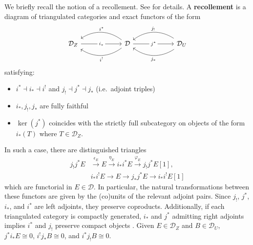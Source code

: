 \documentclass[11pt]{amsart}
\theoremstyle{plain}
\theoremstyle{definition}
\numberwithin{equation}{section}
\numberwithin{theorem}{section}
\begin{document}
We briefly recall the notion of a recollement. 
See \cite[\S 1.4]{Beilinson/Berstein/Deligne/Gabber:2018} for details. 
A \textbf{recollement} is a diagram of triangulated categories and exact functors of the form 
\begin{displaymath}
        \begin{tikzcd}[column sep=6em]
            {\mathcal{D}_Z} & {\mathcal{D}} & {\mathcal{D}_U}
            \arrow["{i_\ast}" description, from=1-1, to=1-2]
            \arrow["{i^\ast}"', bend right=35, from=1-2, to=1-1]
            \arrow["{i^!}", bend left=35, from=1-2, to=1-1]
            \arrow["{j^\ast}" description, from=1-2, to=1-3]
            \arrow["{j_!}"', bend right=35, from=1-3, to=1-2]
            \arrow["{j_\ast}", bend left=35, from=1-3, to=1-2]
        \end{tikzcd}
    \end{displaymath}
satisfying:
\begin{itemize}
    \item $i^\ast \dashv i_\ast \dashv i^!$ and $j_! \dashv j^\ast \dashv j_\ast$ (i.e.\ adjoint triples)
    \item $i_\ast, j_!, j_\ast$ are fully faithful
    \item $\ker (j^\ast)$ coincides with the strictly full subcategory on objects of the form $i_\ast(T)$ where $T\in \mathcal{D}_Z$.
\end{itemize}
In such a case, there are distinguished triangles
\begin{displaymath}
    \begin{aligned}
        j_! j^\ast E 
        & \xrightarrow{\epsilon_E} E 
        \xrightarrow{\eta_E} i_\ast i^\ast E 
        \xrightarrow{\varphi_E} j_! j^\ast E[1],
        \\& i_\ast i^! E \to E \to j_\ast j^\ast E \to i_\ast i^! E[1]
    \end{aligned}
\end{displaymath}
which are functorial in $E\in \mathcal{D}$.
In particular, the natural transformations between these functors are given by the (co)units of the relevant adjoint pairs. 
Since $j_!$, $j^\ast$, $i_\ast$, and $i^\ast$ are left adjoints, they preserve coproducts. 
Additionally, if each triangulated category is compactly generated, $i_\ast$ and $j^\ast$ admitting right adjoints implies $i^\ast$ and $j_!$ preserve compact objects \cite[Theorem 5.1]{Neeman:1996}.
Given $E\in \mathcal{D}_Z$ and $B \in \mathcal{D}_U$, $j^\ast i_\ast E \cong 0$, $i^! j_\ast B \cong 0$, and $i^\ast j_! B \cong 0$. 
\end{document}

